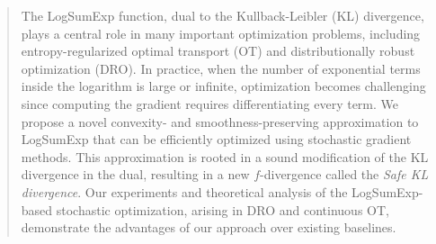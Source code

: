 \documentclass{article}
\theoremstyle{plain}
\theoremstyle{definition}
\theoremstyle{remark}
\begin{document}
\printAffiliationsAndNotice{}  %

\begin{abstract}
    The LogSumExp function, dual to the Kullback-Leibler (KL) divergence, plays a central role in many important optimization problems,
    including entropy-regularized optimal transport (OT) and distributionally robust optimization (DRO). In practice, when the number of exponential terms inside the logarithm is large or infinite, optimization becomes challenging since computing the gradient requires differentiating every term. We propose a novel convexity- and smoothness-preserving approximation to LogSumExp that can be efficiently optimized using stochastic gradient methods. This approximation is rooted in a sound modification of the KL divergence in the dual, resulting in a new $f$-divergence called the \emph{Safe KL divergence}. Our experiments and theoretical analysis of the LogSumExp-based stochastic optimization, arising in DRO and continuous OT, demonstrate the advantages of our approach over existing baselines.
\end{abstract}
\end{document}
